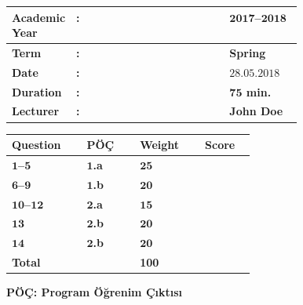 \documentclass[a4paper, 11pt]{article}
\begin{document}
	\begin{table}[!ht]
		\renewcommand{\arraystretch}{1.5}
		\centering
		\begin{tabular}{@{}|>{\bfseries}L{0.18\linewidth}>{\bfseries}C{0.00\linewidth}>{\bfseries}L{0.25\linewidth}|@{}}
			\hline
			Academic Year  & : & $\bm{2017}$--$\bm{2018}$                  \\ \hline
			Term         & : & \textbf{Spring}                             \\ \hline
			Date         & : & $\bm{28.05.2018}$                           \\ \hline
			Duration          & : & $\bm{75}$ \textbf{min.}                \\ \hline
			Lecturer & : & \textbf{John Doe} \\ \hline
		\end{tabular}
		\hfill
		\renewcommand{\arraystretch}{1.1}
		\begin{tabular}{|>{\bfseries}C{0.1\linewidth}|>{\bfseries}C{0.1\linewidth}|>{\bfseries}C{0.1\linewidth}|>{\bfseries}C{0.06\linewidth}|}
			\hline
			Question    & PÖÇ      & Weight & Score \\ \hline
			$\bm{1}$--$\bm{5}$     & $\bm{1}$.a & $\bm{25}$    & ~   \\ \hline
			$\bm{6}$--$\bm{9}$     & $\bm{1}$.b & $\bm{20}$    & ~   \\ \hline
			$\bm{10}$--$\bm{12}$   & $\bm{2}$.a & $\bm{15}$    & ~   \\ \hline
			$\bm{13}$              & $\bm{2}$.b & $\bm{20}$    & ~   \\ \hline
			$\bm{14}$              & $\bm{2}$.b & $\bm{20}$    & ~   \\ \hline
			Total                  & ~          & 100          & ~   \\ \hline
		\end{tabular}
		\vspace{-0.45cm}
		\begin{flushright}
			\textbf{PÖÇ: Program Öğrenim Çıktısı}
		\end{flushright}
	\end{table}
	\vspace{-1cm}
	
\end{document}
